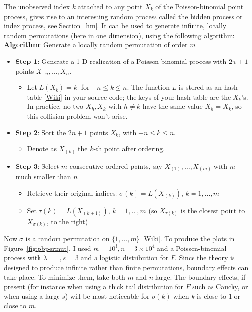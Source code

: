 \documentclass[10pt]{article}
\begin{document}
The unobserved \textcolor{index}{index} $k$ attached to any point $X_k$ of the Poisson-binomial point process, gives rise to an interesting random process called the
\textcolor{index}{hidden process}
 or \textcolor{index}{index process}, see Section~\ref{hm}. It can be used to generate infinite, locally random permutations (here in one dimension), using the following algorithm: \vspace{1ex}\\
{\bf Algorithm}: Generate a locally random permutation of order $m$
\begin{itemize}
\item {\bf Step 1}: Generate a 1-D realization of a Poisson-binomial process with $2n+1$ points $X_{-n},\dots,X_n$.

\begin{itemize}
\item Let $L(X_k)=k$, for $-n\leq k \leq n$. The function $L$ is stored as an
\textcolor{index}{hash table} [\href{https://en.wikipedia.org/wiki/Hash_table}{Wiki}] in your source code; the keys of your hash table are the $X_k$'s. In practice, no two $X_h, X_k$ with $h\neq k$ have the same value $X_h=X_k$, so this collision problem won't arise.
\end{itemize}

\item {\bf Step 2}: Sort the $2n+1$ points $X_k$, with $-n\leq k\leq n$.
\begin{itemize}
\item Denote as $X_{(k)}$ the $k$-th point after ordering.
\end{itemize}

\item {\bf Step 3}: Select $m$ consecutive ordered points, say $X_{(1)},\dots,X_{(m)}$ with $m$ much smaller than $n$
\begin{itemize}
\item Retrieve their original indices: $\sigma(k)=L(X_{(k)})$, $k=1,\dots,m$
\item Set $\tau(k)=L(X_{(k+1)})$, $k=1,\dots,m$ (so $X_{\tau(k)}$ is the closest point to $X_{\sigma(k)}$, to the right)
\end{itemize}
\end{itemize}
Now $\sigma$ is a  \textcolor{index}{random permutation} on $\{1,\dots,m\}$
 [\href{https://en.wikipedia.org/wiki/Random_permutation}{Wiki}]. To produce the plots in Figure~\ref{fig:pbpermut}, I used $m=10^3, n=3\times 10^4$ and a Poisson-binomial process with $\lambda=1,s=3$ and a logistic distribution for $F$. Since the theory is designed to produce infinite rather than finite permutations,
\textcolor{index}{boundary effects} can take place. To minimize them, take both $m$ and $n$ large. The boundary effects, if present (for instance when using a thick tail distribution for $F$ such as Cauchy, or when using a large $s$)  will be most noticeable  for $\sigma(k)$  when $k$ is close to $1$ or close to $m$.
\end{document}
